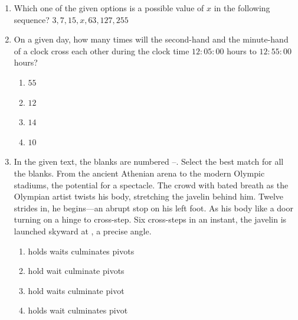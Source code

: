 \documentclass[journal,12pt,onecolumn]{IEEEtran}
\theoremstyle{remark}
\begin{document}
\begin{enumerate}
		\hfill{}
		
		\item Which one of the given options is a possible value of $x$ in the following sequence?
		$3, 7, 15, x, 63, 127, 255$
		
		\hfill{}
		\begin{enumerate}
		\end{enumerate}
		
		\item On a given day, how many times will the second-hand and the minute-hand of a clock cross each other during the clock time $12 \colon 05 \colon 00$ hours to $12 \colon 55 \colon 00$ hours?
		
		\hfill{\brak{\text{GATE CH 2024}}}
		\begin{enumerate}
			\item $55$
			\item $12$
			\item $14$
			\item $10$
		\end{enumerate}
		
		\item In the given text, the blanks are numbered --. Select the best match for all the blanks.
		From the ancient Athenian arena to the modern Olympic stadiums,  the potential for a spectacle. The crowd  with bated breath as the Olympian artist twists his body, stretching the javelin behind him. Twelve strides in, he begins---an abrupt stop on his left foot. As his body  like a door turning on a hinge to cross-step. Six cross-steps in an instant, the javelin is launched skyward at , a precise angle.
		
		\hfill{}
		\begin{enumerate}
			\item {} holds  waits  culminates  pivots
			\item {} hold  wait  culminate  pivots
			\item {} hold  waits  culminate  pivot
			\item {} holds  wait  culminates  pivot
		\end{enumerate}
		

\end{enumerate}
\end{document}
